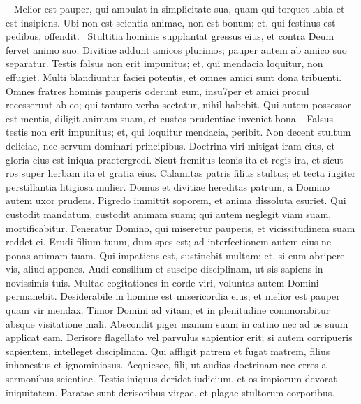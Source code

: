 \begin{biblechapter}   
\verse Melior est pauper, qui ambulat in simplicitate sua, quam qui torquet labia et est insipiens. 
\verse Ubi non est scientia animae, non est bonum; et, qui festinus est pedibus, offendit.  
\verse Stultitia hominis supplantat gressus eius, et contra Deum fervet animo suo. 
\verse Divitiae addunt amicos plurimos; pauper autem ab amico suo separatur. 
\verse Testis falsus non erit impunitus; et, qui mendacia loquitur, non effugiet. 
\verse Multi blandiuntur faciei potentis, et omnes amici sunt dona tribuenti. 
\verse Omnes fratres hominis pauperis oderunt eum, insu7per et amici procul recesserunt ab eo; qui tantum verba sectatur, nihil habebit. 
\verse Qui autem possessor est mentis, diligit animam suam, et custos prudentiae inveniet bona.  
\verse Falsus testis non erit impunitus; et, qui loquitur mendacia, peribit. 
\verse Non decent stultum deliciae, nec servum dominari principibus. 
\verse Doctrina viri mitigat iram eius, et gloria eius est iniqua praetergredi. 
\verse Sicut fremitus leonis ita et regis ira, et sicut ros super herbam ita et gratia eius. 
\verse Calamitas patris filius stultus; et tecta iugiter perstillantia litigiosa mulier. 
\verse Domus et divitiae hereditas patrum, a Domino autem uxor prudens. 
\verse Pigredo immittit soporem, et anima dissoluta esuriet. 
\verse Qui custodit mandatum, custodit animam suam; qui autem neglegit viam suam, mortificabitur. 
\verse Feneratur Domino, qui miseretur pauperis, et vicissitudinem suam reddet ei. 
\verse Erudi filium tuum, dum spes est; ad interfectionem autem eius ne ponas animam tuam. 
\verse Qui impatiens est, sustinebit multam; et, si eum abripere vis, aliud appones. 
\verse Audi consilium et suscipe disciplinam, ut sis sapiens in novissimis tuis. 
\verse Multae cogitationes in corde viri, voluntas autem Domini permanebit. 
\verse Desiderabile in homine est misericordia eius; et melior est pauper quam vir mendax. 
\verse Timor Domini ad vitam, et in plenitudine commorabitur absque visitatione mali. 
\verse Abscondit piger manum suam in catino nec ad os suum applicat eam. 
\verse Derisore flagellato vel parvulus sapientior erit; si autem corripueris sapientem, intelleget disciplinam. 
\verse Qui affligit patrem et fugat matrem, filius inhonestus et ignominiosus. 
\verse Acquiesce, fili, ut audias doctrinam nec erres a sermonibus scientiae. 
\verse Testis iniquus deridet iudicium, et os impiorum devorat iniquitatem. 
\verse Paratae sunt derisoribus virgae, et plagae stultorum corporibus. 
\end{biblechapter}

